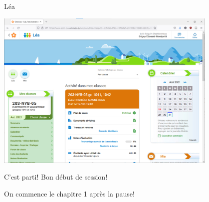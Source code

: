 \documentclass[12pt]{beamer}
\begin{document}
\begin{frame}{Léa}
\begin{center}
\includegraphics[width=0.8\textwidth]{images/lea.png}
\end{center}
\end{frame}



\begin{frame}{C'est parti!}
Bon début de session!

On commence le chapitre 1 après la pause!
\end{frame}
\end{document}
